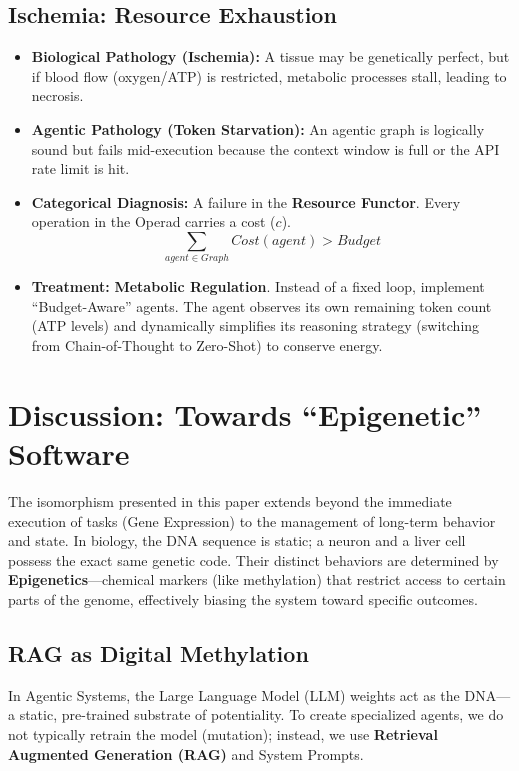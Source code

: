 \documentclass[11pt, a4paper]{article}
\begin{document}
\subsection{Ischemia: Resource Exhaustion}
\begin{itemize}
    \item \textbf{Biological Pathology (Ischemia):} A tissue may be genetically perfect, but if blood flow (oxygen/ATP) is restricted, metabolic processes stall, leading to necrosis.
    \item \textbf{Agentic Pathology (Token Starvation):} An agentic graph is logically sound but fails mid-execution because the context window is full or the API rate limit is hit.
    \item \textbf{Categorical Diagnosis:} A failure in the \textbf{Resource Functor}. Every operation in the Operad carries a cost ($c$).
    \begin{equation}
        \sum_{agent \in Graph} Cost(agent) > Budget
    \end{equation}
    \item \textbf{Treatment:} \textbf{Metabolic Regulation}. Instead of a fixed loop, implement ``Budget-Aware'' agents. The agent observes its own remaining token count (ATP levels) and dynamically simplifies its reasoning strategy (switching from Chain-of-Thought to Zero-Shot) to conserve energy.
\end{itemize}

\section{Discussion: Towards ``Epigenetic'' Software}

The isomorphism presented in this paper extends beyond the immediate execution of tasks (Gene Expression) to the management of long-term behavior and state. In biology, the DNA sequence is static; a neuron and a liver cell possess the exact same genetic code. Their distinct behaviors are determined by \textbf{Epigenetics}---chemical markers (like methylation) that restrict access to certain parts of the genome, effectively biasing the system toward specific outcomes.

\subsection{RAG as Digital Methylation}
In Agentic Systems, the Large Language Model (LLM) weights act as the DNA---a static, pre-trained substrate of potentiality. To create specialized agents, we do not typically retrain the model (mutation); instead, we use \textbf{Retrieval Augmented Generation (RAG)} and System Prompts.
\end{document}

